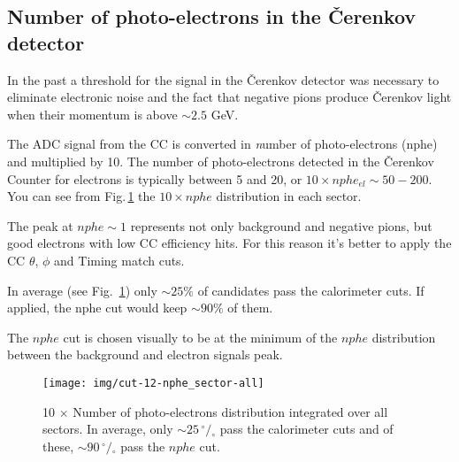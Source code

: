 \subsection{Number of photo-electrons in the \v Cerenkov detector}
\label{sec:cc_cut}
In the past a threshold for the signal in the \v Cerenkov detector was necessary to eliminate
electronic noise and the fact that negative pions produce \v Cerenkov light when
their momentum is above $\sim 2.5$ GeV\@.

The ADC signal from the CC is converted in {\textit number of photo-electrons} (nphe)
and multiplied by 10.
The number of photo-electrons detected in the \v Cerenkov
Counter for electrons is typically between 5 and 20, or $10\times nphe_{el} \sim 50-200$.
You can see from Fig.\,\ref{fig:cccut_alls} the $10\times nphe$
distribution in each sector.

The peak at $nphe \sim 1$ represents not only background and
negative pions, but good electrons with low CC efficiency hits.
For this reason it's better to apply the CC $\theta$, $\phi$ and Timing match cuts.

In average (see Fig.~\ref{fig:cccut_alls}) only $\sim 25\%$ of candidates pass the calorimeter cuts.
If applied, the nphe cut would keep $\sim 90\%$ of them.

The $nphe$ cut is chosen visually to be at the minimum
of the $nphe$ distribution between the background and electron signals peak.


\begin{figure}[ht]
    \centering
    \texttt{[image: img/cut-12-nphe\_sector-all]}
    \caption{10 $\times$ Number of photo-electrons distribution integrated over all sectors.
    In average, only $\sim 25 \,^{\circ\!\!}/\!_\circ$ pass the calorimeter cuts and of these,
        $\sim 90 \,^{\circ\!\!}/\!_\circ$ pass the $nphe$ cut.}
    \label{fig:cccut_alls}
\end{figure}
		


